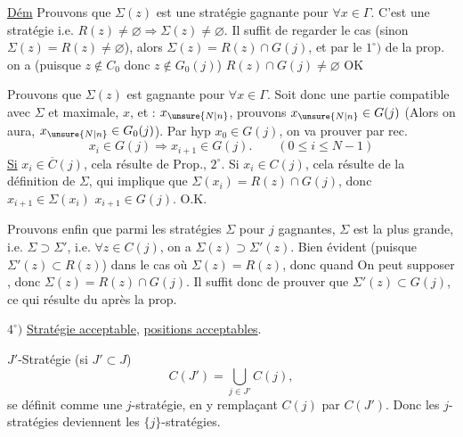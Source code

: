 \uline{Dém} Prouvons que $\Sigma(z)$ est une stratégie gagnante pour $\forall x\in\Gamma$. C'est une stratégie i.e. $R(z)\ne\varnothing\Longrightarrow\Sigma(z)\ne\varnothing$. Il suffit de regarder le cas  (sinon $\Sigma(z)=R(z)\ne\varnothing$), alors $\Sigma(z)=R(z)\cap G(j)$, et par le $1^\circ)$ de la prop. on a (puisque $z\notin C_0$ donc $z\notin G_0(j)$) $R(z)\cap G(j)\ne\varnothing$ OK

Prouvons que $\Sigma(z)$ est gagnante pour $\forall x\in\Gamma$. Soit donc une partie  compatible avec $\Sigma$ et maximale,  $x$, et  : $x_{\unsure{N|n}}$, prouvons $x_{\unsure{N|n}}\in G(j)$ (Alors on aura, $x_{\unsure{N|n}}\in G_0(j)$). Par hyp $x_0\in G(j)$, on va prouver par rec.
\[
x_i\in G(j)\Longrightarrow x_{i+1}\in G(j).\qquad(0\leq i\leq N-1)
\]
\uline{Si} $x_i\in\overline C(j)$, cela résulte de Prop., $2^\circ$. Si $x_i\in C(j)$, cela résulte de la définition de $\Sigma$, qui implique que $\Sigma(x_i)=R(z)\cap G(j)$, donc  $x_{i+1}\in\Sigma(x_i)$  $x_{i+1}\in G(j)$. O.K.

Prouvons enfin que parmi les stratégies $\Sigma$
pour $j$ \inserted{$\Gamma$-}gagnantes,  $\Sigma$ est la plus grande, i.e. $\Sigma\supset\Sigma'$, i.e. $\forall z\in C(j)$, on a $\Sigma(z)\supset\Sigma'(z)$. Bien évident (puisque $\Sigma'(z)\subset R(z)$)  dans le cas où $\Sigma(z)=R(z)$, donc quand   On peut supposer , donc $\Sigma(z)=R(z)\cap G(j)$. Il suffit donc de prouver que $\Sigma'(z)\subset G(j)$,  ce qui résulte du  après la prop.


$4^\circ)$ \uline{Stratégie acceptable}, \uline{positions acceptables}.

$J'$-Stratégie (si $J'\subset J$)  
\[
C(J')=\bigcup_{j\in J'}C(j),
\]
se définit comme une $j$-stratégie, en y remplaçant $C(j)$ par $C(J')$.
Donc les $j$-stratégies deviennent les $\{j\}$-stratégies.

